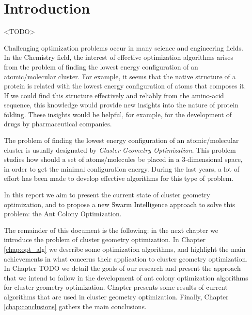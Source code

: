 \chapter{Introduction}

<TODO>

Challenging optimization problems occur in many science and engineering fields. In the Chemistry field, the interest of effective optimization algorithms arises from the problem of finding the lowest energy configuration of an atomic/molecular cluster. For example, it seems that the native structure of a protein is related with the lowest energy configuration of atoms that composes it\cite{wales97}. If we could find this structure effectively and reliably from the amino-acid sequence, this knowledge would provide new insights into the nature of protein folding. These insights would be helpful, for example, for the development of drugs by pharmaceutical companies.

The problem of finding the lowest energy configuration of an atomic/molecular cluster is usually designated by \emph{Cluster Geometry Optimization}. This problem studies how should a set of atoms/molecules be placed in a 3-dimensional space, in order to get the minimal configuration energy. During the last years, a lot of effort has been made to develop effective algorithms for this type of problem.

In this report we aim to present the current state of cluster geometry optimization, and to propose a new Swarm Intelligence approach to solve this problem: the Ant Colony Optimization.

The remainder of this document is the following: in the next chapter we introduce the problem of cluster geometry optimization. In Chapter \ref{chap:opt_alg} we describe some optimization algorithms, and highlight the main achievements in what concerns their application to cluster geometry optimization. In Chapter TODO we detail the goals of our research and present the approach that we intend to follow in the development of ant colony optimization algorithms for cluster geometry optimization. Chapter presents some results of current algorithms that are used in cluster geometry optimization. Finally, Chapter \ref{chap:conclusions} gathers the main conclusions.



